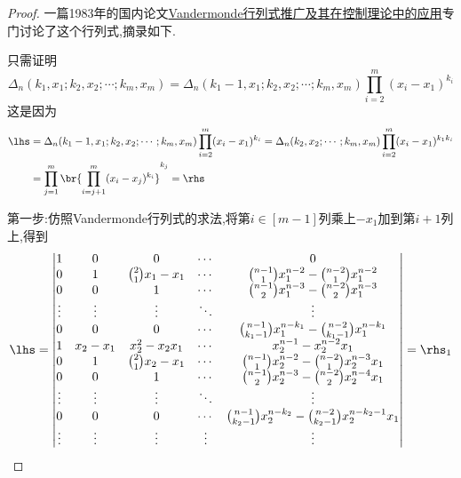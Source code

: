 \documentclass{article}
\theoremstyle{definition}
\begin{document}
\begin{proof}
    一篇1983年的国内论文\href{https://ishare.iask.sina.com.cn/f/19082819.html}{Vandermonde行列式推广及其在控制理论中的应用}专门讨论了这个行列式,摘录如下.

    只需证明$$\Delta_n(k_1,x_1;k_2,x_2;\cdots;k_m,x_m)=\Delta_n(k_1-1,x_1;k_2,x_2;\cdots;k_m,x_m)\prod_{i=2}^m(x_i-x_1)^{k_i}$$
    这是因为
    $$\begin{aligned}
        \lhs&=\Delta_n(k_1-1,x_1;k_2,x_2;\cdots;k_m,x_m)\prod_{i=2}^m(x_i-x_1)^{k_i}=\Delta_n(k_2,x_2;\cdots;k_m,x_m)\prod_{i=2}^m(x_i-x_1)^{k_1k_i}\\
        &=\prod_{j=1}^m\br{\prod_{i=j+1}^m(x_i-x_j)^{k_i}}^{k_j}=\rhs
    \end{aligned}$$

    第一步:仿照Vandermonde行列式的求法,将第$i\in [m-1]$列乘上$-x_1$加到第$i+1$列上,得到
    $$\lhs=\begin{vmatrix}
        1&0&0&\cdots&0\\
        0&1&\binom{2}{1}x_1-x_1&\cdots&\binom{n-1}{1}x^{n-2}_1-\binom{n-2}{1}x^{n-2}_1\\
        0&0&1&\cdots&\binom{n-1}{2}x^{n-3}_1-\binom{n-2}{2}x^{n-3}_1\\
        \vdots&\vdots&\vdots&\ddots&\vdots\\
        0&0&0&\cdots&\binom{n-1}{k_1-1}x^{n-k_1}_1-\binom{n-2}{k_1-1}x^{n-k_1}_1\\
        1&x_2-x_1&x^2_2-x_2x_1&\cdots&x^{n-1}_2-x^{n-2}_2x_1\\
        0&1&\binom{2}{1}x_2-x_1&\cdots&\binom{n-1}{1}x^{n-2}_2-\binom{n-2}{1}x^{n-3}_2x_1\\
        0&0&1&\cdots&\binom{n-1}{2}x^{n-3}_2-\binom{n-2}{2}x^{n-4}_2x_1\\
        \vdots&\vdots&\vdots&\ddots&\vdots\\
        0&0&0&\cdots&\binom{n-1}{k_2-1}x^{n-k_2}_2-\binom{n-2}{k_2-1}x^{n-k_2-1}_2x_1\\
        \vdots&\vdots&\vdots&\vdots&\vdots\\
    \end{vmatrix}=\rhs_1$$


\end{proof}
\end{document}
